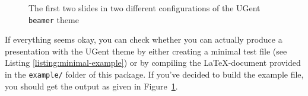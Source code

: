 \documentclass[a4paper,10pt]{article}
\theoremstyle{definition}
\newlength\figurewidth
\begin{document}
\begin{figure}[t]
  \caption{The first two slides in two different configurations of the UGent \texttt{beamer} theme}
  \label{figure:example-output}
\end{figure}

If everything seems okay, you can check whether you can actually produce a presentation with the UGent theme by either creating a minimal test file (see Listing \ref{listing:minimal-example}) or by compiling the \LaTeX-document provided in the \verb!example/! folder of this package. If you've decided to build the example file, you should get the output as given in Figure~\ref{figure:example-output}.
\end{document}

